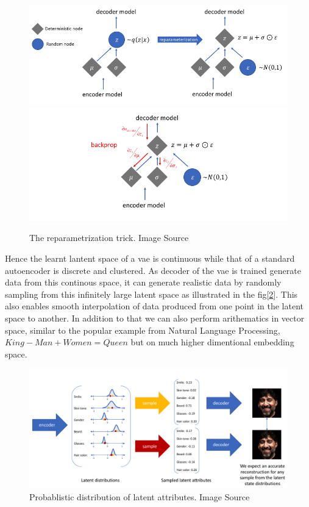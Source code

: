 \begin{figure}[!h]
    \centering
    \includegraphics[scale=0.5]{figures/reparametrization_trick.png}
    \includegraphics[scale=0.5]{figures/rep_trick.png}
    \caption{The reparametrization trick. Image Source \cite{jeremy_jordan_2018}}
    \label{fig:reparametrization_trick}
\end{figure}

Hence the learnt lantent space of a \ac{vae} is continuous while that of a standard autoencoder is discrete and clustered. As decoder of the \ac{vae} is trained generate data from this continous space, it can generate realistic data by randomly sampling from this infinitely large latent space as illustrated in the fig[\ref{fig:vae_latent_attribute}]. This also enables smooth interpolation of data produced from one point in the latent space to another. In addition to that we can also perform arithematics in vector space, similar to the popular example from Natural Language Processing, $King - Man + Women = Queen$ but on much higher dimentional embedding space.

\begin{figure}[!h]
    \centering
    \includegraphics[scale=0.4]{figures/vae_latent_attribute.png}
    \caption{Probablistic distribution of latent attributes. Image Source \cite{jeremy_jordan_2018}}
    \label{fig:vae_latent_attribute}
\end{figure}

